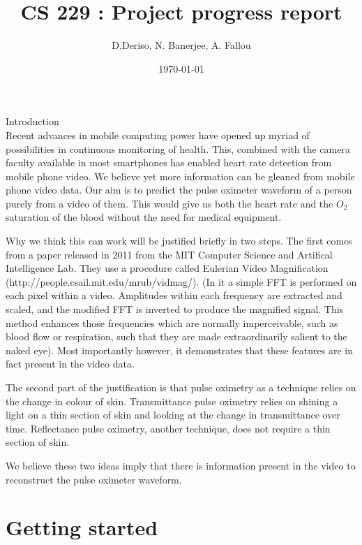 \documentclass[12pt]{article}
\begin{document}
  \title{CS 229 : Project progress report}
  \author{D.Deriso, N. Banerjee, A. Fallou}
  \date{\today}
  \maketitle
  \thispagestyle{empty}

\large Introduction \\
%
\small Recent advances in mobile computing power have opened up myriad of possibilities in continuous monitoring of health. 
This, combined with the camera faculty available in most smartphones has enabled heart rate detection from mobile phone video. 
We believe yet more information can be gleaned from mobile phone video data. 
Our aim is to predict the pulse oximeter waveform of a person purely from a video of them. 
This would give us both the heart rate and the $O_2$ saturation of the blood without the need for medical equipment.

Why we think this can work will be justified briefly in two steps. 
The first comes from a paper released in 2011 from the MIT Computer Science and Artifical Intelligence Lab. 
They use a procedure called Eulerian Video Magnification (http://people.csail.mit.edu/mrub/vidmag/). 
(In it a simple FFT is performed on each pixel within a video. Amplitudes within each frequency are extracted and scaled, and the modified FFT is inverted to produce the magnified signal. 
This method enhances those frequencies which are normally imperceivable, such as blood flow or respiration, such that they are made extraordinarily salient to the naked eye). 
Most importantly however, it demonstrates that these features are in fact present in the video data.

The second part of the justification is that pulse oximetry as a technique relies on the change in colour of skin. 
Transmittance pulse oximetry relies on shining a light on a thin section of skin and looking at the change in transmittance over time. 
Reflectance pulse oximetry, another technique, does not require a thin section of skin.

We believe these two ideas imply that there is information present in the video to reconstruct the pulse oximeter waveform.

\section{Getting started}
\end{document}
